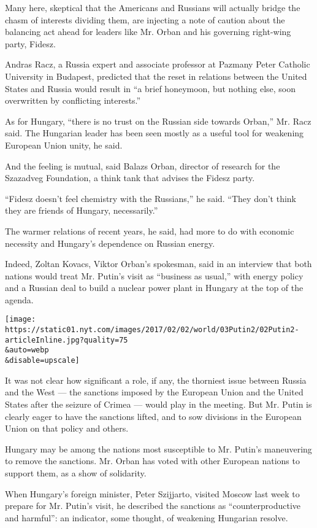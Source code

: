 Many here, skeptical that the Americans and Russians will actually
bridge the chasm of interests dividing them, are injecting a note of
caution about the balancing act ahead for leaders like Mr. Orban and his
governing right-wing party, Fidesz.

Andras Racz, a Russia expert and associate professor at Pazmany Peter
Catholic University in Budapest, predicted that the reset in relations
between the United States and Russia would result in ``a brief
honeymoon, but nothing else, soon overwritten by conflicting
interests.''

As for Hungary, ``there is no trust on the Russian side towards Orban,''
Mr. Racz said. The Hungarian leader has been seen mostly as a useful
tool for weakening European Union unity, he said.

And the feeling is mutual, said Balazs Orban, director of research for
the Szazadveg Foundation, a think tank that advises the Fidesz party.

``Fidesz doesn't feel chemistry with the Russians,'' he said. ``They
don't think they are friends of Hungary, necessarily.''

The warmer relations of recent years, he said, had more to do with
economic necessity and Hungary's dependence on Russian energy.

Indeed, Zoltan Kovacs, Viktor Orban's spokesman, said in an interview
that both nations would treat Mr. Putin's visit as ``business as
usual,'' with energy policy and a Russian deal to build a nuclear power
plant in Hungary at the top of the agenda.

\texttt{[image: https://static01.nyt.com/images/2017/02/02/world/03Putin2/02Putin2-articleInline.jpg?quality=75\\\&auto=webp\\\&disable=upscale]}

It was not clear how significant a role, if any, the thorniest issue
between Russia and the West --- the sanctions imposed by the European
Union and the United States after the seizure of Crimea --- would play
in the meeting. But Mr. Putin is clearly eager to have the sanctions
lifted, and to sow divisions in the European Union on that policy and
others.

Hungary may be among the nations most susceptible to Mr. Putin's
maneuvering to remove the sanctions. Mr. Orban has voted with other
European nations to support them, as a show of solidarity.

When Hungary's foreign minister, Peter Szijjarto, visited Moscow last
week to prepare for Mr. Putin's visit, he described the sanctions as
``counterproductive and harmful'': an indicator, some thought, of
weakening Hungarian resolve.

